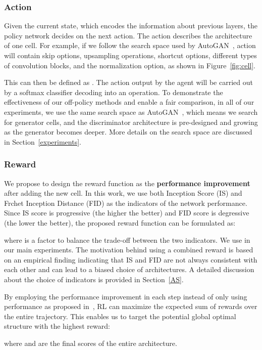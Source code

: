 \documentclass[runningheads]{llncs}
\begin{document}
\subsubsection{Action}
Given the current state, which encodes the information about previous layers, the policy network decides on the next action. The action describes the architecture of one cell. For example, if we follow the search space used by AutoGAN~\cite{gong2019autogan}, action will contain skip options, upsampling operations, shortcut options, different types of convolution blocks, and the normalization option, as shown in Figure~\ref{fig:cell}. 

This can then be defined as . The action output by the agent will be carried out by a softmax classifier decoding into an operation. To demonstrate the effectiveness of our off-policy methods and enable a fair comparison,  in all of our experiments, we use the same search space as AutoGAN~\cite{gong2019autogan}, which means we search for generator cells, and the discriminator architecture  is pre-designed and growing as the generator becomes deeper.  More details on the search space are discussed in Section~\ref{experiments}. 
\subsubsection{Reward}
We propose to design the reward function as the \textbf{performance improvement} after adding the new cell. In this work, we use both Inception Score (IS) and Frchet Inception Distance (FID) as the indicators of the network performance. Since IS score is progressive (the higher the better) and FID score is degressive (the lower the better), the  proposed reward function can be formulated as:

where  is a factor to balance the trade-off between the two indicators. We use  in our main experiments. The motivation behind using a combined reward is based on an empirical finding indicating that IS and FID are not always consistent with each other and can lead to a biased choice of architectures. A detailed discussion about the choice of indicators is provided in Section~\ref{AS}.

By employing the performance improvement in each step instead of only using performance as proposed in~\cite{gong2019autogan}, RL can maximize the expected sum of rewards over the entire trajectory. This enables us to target the potential global optimal structure with the highest reward:


where  and  are the final scores of the entire architecture.
\end{document}
